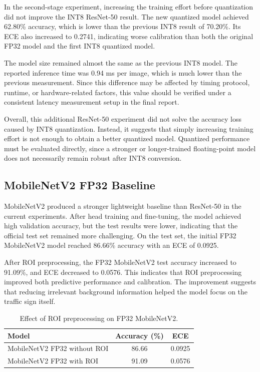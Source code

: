 \documentclass{article} %
\begin{document}
In the second-stage experiment, increasing the training effort before quantization did not improve the INT8 ResNet-50 result. The new quantized model achieved 62.80\% accuracy, which is lower than the previous INT8 result of 70.20\%. Its ECE also increased to 0.2741, indicating worse calibration than both the original FP32 model and the first INT8 quantized model.

The model size remained almost the same as the previous INT8 model. The reported inference time was 0.94 ms per image, which is much lower than the previous measurement. Since this difference may be affected by timing protocol, runtime, or hardware-related factors, this value should be verified under a consistent latency measurement setup in the final report.

Overall, this additional ResNet-50 experiment did not solve the accuracy loss caused by INT8 quantization. Instead, it suggests that simply increasing training effort is not enough to obtain a better quantized model. Quantized performance must be evaluated directly, since a stronger or longer-trained floating-point model does not necessarily remain robust after INT8 conversion.

\subsection{MobileNetV2 FP32 Baseline}

MobileNetV2 produced a stronger lightweight baseline than ResNet-50 in the current experiments. After head training and fine-tuning, the model achieved high validation accuracy, but the test results were lower, indicating that the official test set remained more challenging. On the test set, the initial FP32 MobileNetV2 model reached 86.66\% accuracy with an ECE of 0.0925.

After ROI preprocessing, the FP32 MobileNetV2 test accuracy increased to 91.09\%, and ECE decreased to 0.0576. This indicates that ROI preprocessing improved both predictive performance and calibration. The improvement suggests that reducing irrelevant background information helped the model focus on the traffic sign itself.

\begin{table}[t]
\centering
\caption{Effect of ROI preprocessing on FP32 MobileNetV2.}
\label{tab:roi_effect}
\begin{tabular}{lcc}
\toprule
Model & Accuracy (\%) & ECE \\
\midrule
MobileNetV2 FP32 without ROI & 86.66 & 0.0925 \\
MobileNetV2 FP32 with ROI & 91.09 & 0.0576 \\
\bottomrule
\end{tabular}
\end{table}
\end{document}
